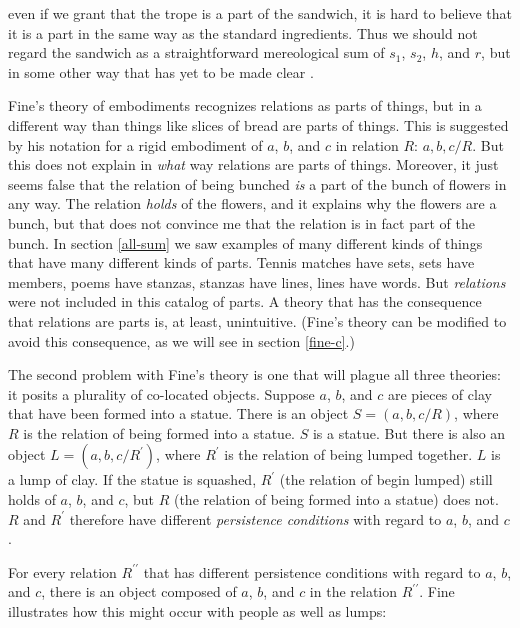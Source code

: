 \documentclass[11pt]{article}
\newenvironment{squote}{%
\begin{spacing}{1}
\begin{list}{}{%
\setlength{\labelwidth}{0pt}%
\rightmargin\leftmargin%
}
\item\relax
}{%
\end{list}%
\end{spacing}
}
\begin{document}
\begin{spacing}{1.5}
\begin{squote}
even if we grant that the trope is a part of the sandwich, it is hard
to believe that it is a part in the same way as the standard
ingredients.  Thus we should not regard the sandwich as a
straightforward mereological sum of $s_1$, $s_2$, $h$, and $r$, but in
some other way that has yet to be made clear \citep[64]{fine1999}.
\end{squote}

Fine's theory of embodiments recognizes relations as parts of things,
but in a different way than things like slices of bread are parts of
things.  This is suggested by his notation for a rigid embodiment of
$a$, $b$, and $c$ in relation $R$: $a, b, c / R$.  But this does not
explain in {\em what} way relations are parts of things.  Moreover, it
just seems false that the relation of being bunched {\em is} a part of
the bunch of flowers in any way.  The relation {\em holds} of the
flowers, and it explains why the flowers are a bunch, but that does
not convince me that the relation is in fact part of the bunch.  In
section \ref{all-sum} we saw examples of many different kinds of
things that have many different kinds of parts.  Tennis matches have
sets, sets have members, poems have stanzas, stanzas have lines, lines
have words.  But {\em relations} were not included in this catalog of
parts.  A theory that has the consequence that relations are parts is,
at least, unintuitive.  (Fine's theory can be modified to avoid this
consequence, as we will see in section \ref{fine-c}.)

The second problem with Fine's theory is one that will plague all
three theories: it posits a plurality of co-located objects.  Suppose
$a$, $b$, and $c$ are pieces of clay that have been formed into a
statue.  There is an object $S = ( a, b, c / R )$, where $R$ is the
relation of being formed into a statue.  $S$ is a statue.  But there
is also an object $L = ( a, b, c / R^{\prime} ) $, where $R^{\prime}$
is the relation of being lumped together.  $L$ is a lump of clay.  If
the statue is squashed, $R^{\prime}$ (the relation of begin lumped)
still holds of $a$, $b$, and $c$, but $R$ (the relation of being
formed into a statue) does not.  $R$ and $R^{\prime}$ therefore have
different {\em persistence conditions} with regard to $a$, $b$, and
$c$.

For every relation $R^{\prime \prime}$ that has different persistence
conditions with regard to $a$, $b$, and $c$, there is an object
composed of $a$, $b$, and $c$ in the relation $R^{\prime \prime}$.
Fine illustrates how this might occur with people as well as lumps:


\end{spacing}
\end{document}
